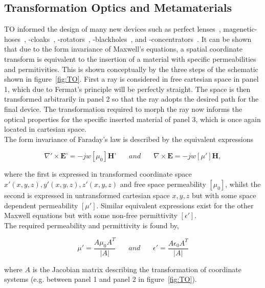 \documentclass[11pt]{iopart}
\begin{document}
\subsection{Transformation Optics and Metamaterials}
TO informed the design of many new devices such as perfect
lenses~\cite{}, magenetic-hoses~\cite{}, -cloaks~\cite{},
-rotators~\cite{}, -blackholes~\cite{}, and -concentrators~\cite{}. It
can be shown that due to the form invariance of Maxwell's equations, a
spatial coordinate transform is equivalent to the insertion of a
material with specific permeabilities and permitivities. This is shown
conceptually by the three steps of the schematic shown in
figure~\ref{fig:TO}. First a ray is considered in free cartesian space in panel
1, which due to Fermat's principle will be perfectly straight. The
space is then transformed arbitrarily in panel 2 so that the ray adopts the
desired path for the final device. The transformation required to
morph the ray now informs the optical properties for the specific
inserted material of panel 3, which is once again located in cartesian
space.\\

The form invariance of Faraday's law is described by the equivalent expressions 

\begin{equation}
  \label{ME1}
  \nabla'\times \textbf{E'} = -jw[\mu_0]\textbf{H'}
  ~~~~~~~~and~~~~~~~~
  \nabla\times \textbf{E} = -jw[\mu']\textbf{H},
\end{equation}

where the first is expressed in transformed coordinate space $x'(x, y,
z), y'(x, y, z), z'(x, y, z)$ and free space permeability $[\mu_0]$,
whilst the second is expressed in untransformed cartesian space $x, y,
z$ but with some space dependent permeability $[\mu']$. Similar
equivalent expressions exist for the other Maxwell equations but with
some non-free permittivity $[\epsilon']$.\\
The required permeability and permittivity is found by,

\begin{equation}
  \label{eqn:J}
  \mu'=\frac{A\mu_0 A^T}{|A|}
  ~~~~~~~~and~~~~~~~~
  \epsilon'=\frac{A\epsilon_0 A^T}{|A|}
\end{equation}

where $A$ is the Jacobian matrix describing the transformation of
coordinate systems (e.g. between panel 1 and panel 2 in
figure~\ref{fig:TO}). \\
\end{document}
